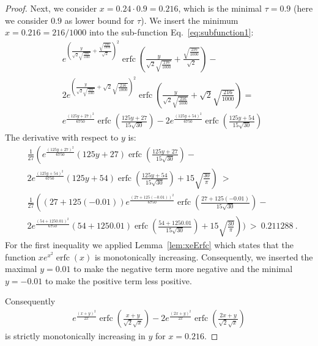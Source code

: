 \documentclass{article}
\DeclareMathOperator{\erfc}{erfc}
\begin{document}
\begin{proof}
Next, we consider $x=0.24 \cdot 0.9=0.216$, which is the minimal
$\tau=0.9$ (here we consider $0.9$ as lower bound for $\tau$).
We insert the minimum $x=0.216=216/1000$ into the  sub-function
Eq.~\eqref{eq:subfunction1}:
\begin{align}
&e^{\left(\frac{y}{\sqrt{2} \sqrt{\frac{216}{1000}}}+\frac{\sqrt{\frac{216}{1000}}}{\sqrt{2}}\right)^2} \erfc \left(\frac{y}{\sqrt{2} \sqrt{\frac{216}{1000}}}+\frac{\sqrt{\frac{216}{1000}}}{\sqrt{2}}\right)-\\ \nonumber &2 e^{\left(\frac{y}{\sqrt{2} \sqrt{\frac{216}{1000}}}+\sqrt{2} \sqrt{\frac{216}{1000}}\right)^2} \erfc \left(\frac{y}{\sqrt{2} \sqrt{\frac{216}{1000}}}+\sqrt{2} \sqrt{\frac{216}{1000}}\right)=\\ \nonumber &e^{\frac{(125 y+27)^2}{6750}} \erfc \left(\frac{125 y+27}{15 \sqrt{30}}\right)-2 e^{\frac{(125 y+54)^2}{6750}} \erfc \left(\frac{125 y+54}{15 \sqrt{30}}\right)
\end{align}
The derivative with respect to $y$ is: 
\begin{align}
&\frac{1}{27} \left(e^{\frac{(125 y+27)^2}{6750}} (125 y+27) \erfc \left(\frac{125 y+27}{15 \sqrt{30}}\right)-\right. \\ \nonumber &\left.2 e^{\frac{(125 y+54)^2}{6750}} (125 y+54) \erfc \left(\frac{125 y+54}{15 \sqrt{30}}\right)+15 \sqrt{\frac{30}{\pi }}\right)\ > \ \\ \nonumber&\frac{1}{27} \left((27+125 (-0.01)) e^{\frac{(27+125 (-0.01))^2}{6750}} \erfc \left(\frac{27+125 (-0.01)}{15 \sqrt{30}}\right)-\right. \\ \nonumber &\left.2 e^{\frac{(54+125 0.01)^2}{6750}} (54+125 0.01) \erfc \left(\frac{54+125 0.01}{15 \sqrt{30}}\right)+15 \sqrt{\frac{30}{\pi }}\right))\ > \ 0.211288\ .
\end{align}
For the first inequality we applied Lemma~\ref{lem:xeErfc}
which states that the function $x e^{x^2} \erfc (x)$ is
monotonically increasing.
Consequently, we inserted the maximal $y=0.01$ to
make the negative term more negative and the minimal $y=-0.01$
to make the positive term less positive.

Consequently 
\begin{align}
e^{\frac{(x+y)^2}{2 x}} \erfc \left(\frac{x+y}{\sqrt{2} \sqrt{x}}\right)-2 e^{\frac{(2 x+y)^2}{2 x}} \erfc \left(\frac{2 x+y}{\sqrt{2} \sqrt{x}}\right)
\end{align}
is strictly monotonically increasing in $y$ for $x=0.216$. 
\end{proof}
\end{document}
